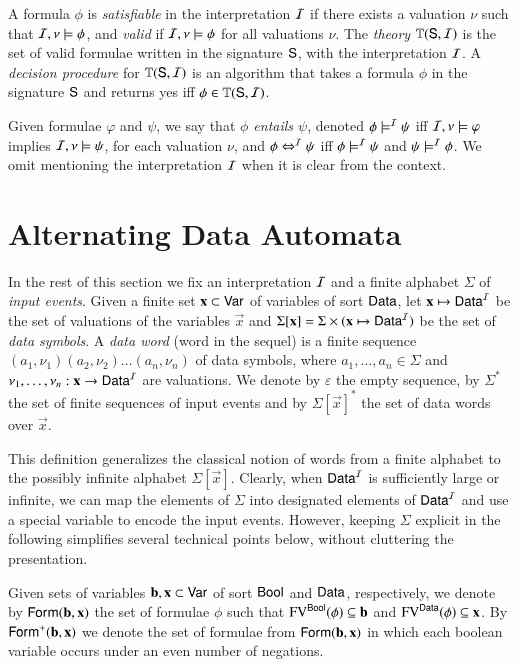 \documentclass[10pt,conference,letterpaper,twocolumn]{IEEEtran}
\begin{document}
A formula $\phi$ is \emph{satisfiable} in the interpretation $\mathcal{I}$ if
there exists a valuation $\nu$ such that $\mathcal{I},\nu \models \phi$, and
\emph{valid} if $\mathcal{I},\nu \models \phi$ for all valuations $\nu$.  The
\emph{theory} $\mathbb{T}(\mathsf{S},\mathcal{I})$ is the set of valid formulae written
in the signature $\mathsf{S}$, with the interpretation $\mathcal{I}$. A \emph{decision
procedure} for $\mathbb{T}(\mathsf{S},\mathcal{I})$ is an algorithm that takes a formula
$\phi$ in the signature $\mathsf{S}$ and returns yes iff $\phi \in
\mathbb{T}(\mathsf{S},\mathcal{I})$. 

Given formulae $\varphi$ and $\psi$, we say that \emph{$\phi$ entails
  $\psi$}, denoted $\phi \models^{\mathcal{I}} \psi$ iff $\mathcal{I},\nu \models \varphi$
implies $\mathcal{I},\nu \models \psi$, for each valuation $\nu$, and $\phi
\Leftrightarrow^{\mathcal{I}} \psi$ iff $\phi \models^{\mathcal{I}} \psi$ and $\psi \models^{\mathcal{I}} \phi$.
We omit mentioning the interpretation $\mathcal{I}$ when it is clear from the
context.

\section{Alternating Data Automata}

In the rest of this section we fix an interpretation $\mathcal{I}$ and a finite
alphabet $\Sigma$ of \emph{input events}. Given a finite set $\mathbf x
\subset \mathsf{Var}$ of variables of sort $\mathsf{Data}$, let $\mathbf x \mapsto
\mathsf{Data}^{\mathcal{I}}$ be the set of valuations of the variables $\vec{x}$ and
$\Sigma[\mathbf x] = \Sigma \times (\mathbf x \mapsto \mathsf{Data}^{\mathcal{I}})$ be the
set of \emph{data symbols}. A \emph{data word} (word in the sequel) is
a finite sequence $(a_1,\nu_1)(a_2,\nu_2) \ldots (a_n,\nu_n)$ of data
symbols, where $a_1,\ldots,a_n \in \Sigma$ and $\nu_1,\ldots,\nu_n :
\mathbf x \rightarrow \mathsf{Data}^{\mathcal{I}}$ are valuations. We denote by
$\varepsilon$ the empty sequence, by $\Sigma^*$ the set of finite
sequences of input events and by $\Sigma[\vec{x}]^*$ the set of data
words over $\vec{x}$.

This definition generalizes the classical notion of words from a
finite alphabet to the possibly infinite alphabet
$\Sigma[\vec{x}]$. Clearly, when $\mathsf{Data}^{\mathcal{I}}$ is sufficiently large or
infinite, we can map the elements of $\Sigma$ into designated elements
of $\mathsf{Data}^{\mathcal{I}}$ and use a special variable to encode the input
events. However, keeping $\Sigma$ explicit in the following simplifies
several technical points below, without cluttering the presentation.

Given sets of variables $\mathbf b,\mathbf x \subset \mathsf{Var}$ of sort
$\mathsf{Bool}$ and $\mathsf{Data}$, respectively, we denote by
$\mathsf{Form}(\mathbf b,\mathbf x)$ the set of formulae $\phi$ such that
$\mathrm{FV}^{\mathsf{Bool}}(\phi) \subseteq \mathbf b$ and $\mathrm{FV}^{\mathsf{Data}}(\phi) \subseteq
\mathbf x$. By $\mathsf{Form}^+(\mathbf b,\mathbf x)$ we denote the set of formulae
from $\mathsf{Form}(\mathbf b,\mathbf x)$ in which each boolean variable occurs
under an even number of negations.
\end{document}
